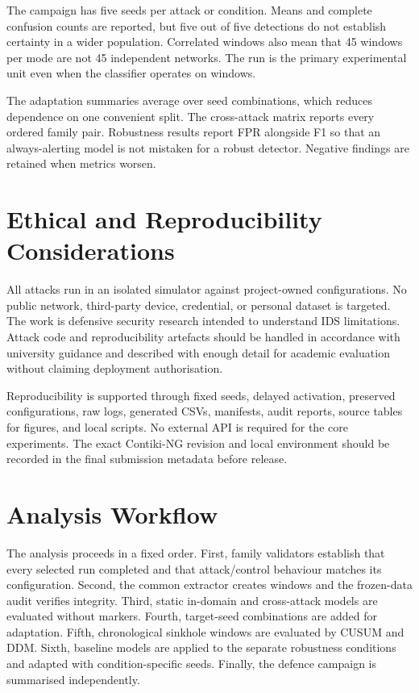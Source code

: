 The campaign has five seeds per attack or condition. Means and complete confusion counts are reported, but five out of five detections do not establish certainty in a wider population. Correlated windows also mean that 45 windows per mode are not 45 independent networks. The run is the primary experimental unit even when the classifier operates on windows.

The adaptation summaries average over seed combinations, which reduces dependence on one convenient split. The cross-attack matrix reports every ordered family pair. Robustness results report FPR alongside F1 so that an always-alerting model is not mistaken for a robust detector. Negative findings are retained when metrics worsen.

\section{Ethical and Reproducibility Considerations}

All attacks run in an isolated simulator against project-owned configurations. No public network, third-party device, credential, or personal dataset is targeted. The work is defensive security research intended to understand IDS limitations. Attack code and reproducibility artefacts should be handled in accordance with university guidance and described with enough detail for academic evaluation without claiming deployment authorisation.

Reproducibility is supported through fixed seeds, delayed activation, preserved configurations, raw logs, generated CSVs, manifests, audit reports, source tables for figures, and local scripts. No external API is required for the core experiments. The exact Contiki-NG revision and local environment should be recorded in the final submission metadata before release.

\section{Analysis Workflow}

The analysis proceeds in a fixed order. First, family validators establish that every selected run completed and that attack/control behaviour matches its configuration. Second, the common extractor creates windows and the frozen-data audit verifies integrity. Third, static in-domain and cross-attack models are evaluated without markers. Fourth, target-seed combinations are added for adaptation. Fifth, chronological sinkhole windows are evaluated by CUSUM and DDM. Sixth, baseline models are applied to the separate robustness conditions and adapted with condition-specific seeds. Finally, the defence campaign is summarised independently.

